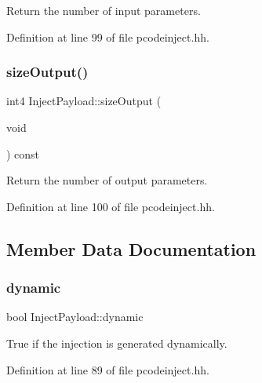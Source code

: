 Return the number of input parameters. 



Definition at line 99 of file pcodeinject.\+hh.

\mbox{\label{class_inject_payload_aca3efb5572ec0a76732554ee41600193}} 
\subsubsection{\texorpdfstring{sizeOutput()}{sizeOutput()}}
{\footnotesize\ttfamily int4 Inject\+Payload\+::size\+Output (\begin{DoxyParamCaption}\item[{void}]{ }\end{DoxyParamCaption}) const\hspace{0.3cm}{\ttfamily [inline]}}



Return the number of output parameters. 



Definition at line 100 of file pcodeinject.\+hh.



\subsection{Member Data Documentation}
\mbox{\label{class_inject_payload_a17ef3ad9e289596c2ea756b44f03e043}} 
\subsubsection{\texorpdfstring{dynamic}{dynamic}}
{\footnotesize\ttfamily bool Inject\+Payload\+::dynamic\hspace{0.3cm}{\ttfamily [protected]}}



True if the injection is generated dynamically. 



Definition at line 89 of file pcodeinject.\+hh.

\mbox{\label{class_inject_payload_a60b9ce0c3f608f1a9be223342948fa07}} 
